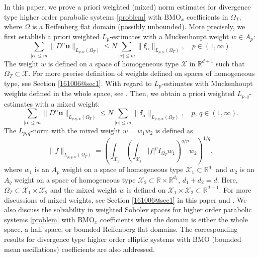 \documentclass[reqno]{amsart}
\numberwithin{equation}{section}
\theoremstyle{plain}
\theoremstyle{definition}
\theoremstyle{remark}
\begin{document}
In this paper,  we prove a priori weighted (mixed) norm estimates for divergence type higher order parabolic systems \eqref{problem} with ${\mathrm{BMO}}_x$ coefficients in  $\Omega_T$, where $\Omega$ is a Reifenberg flat domain (possibly unbounded).
More precisely, we first establish a priori weighted $L_p$-estimates with a Muckenhoupt weight $w\in A_p$:
$$
\sum_{|\alpha|\le m}\|D^\alpha {\boldsymbol{u}}\|_{L_{p,w}(\Omega_T)}\le N\sum_{|\alpha|\le m}\|{\boldsymbol{f}}_\alpha\|_{L_{p,w}(\Omega_T)}, \quad p\in (1,\infty).
$$
The weight $w$ is  defined on a space of homogeneous type ${\mathcal{X}}$ in ${\mathbb{R}}^{d+1}$ such that $\Omega_T \subset {\mathcal{X}}$. 
For  more precise definition of weights defined on spaces of homogeneous type, see Section \ref{161006@sec1}.
With regard to $L_p$-estimates with Muckenhoupt weights defined in the whole space, see \cite{MR3225808, MR3467697, arXiv:1410.6394v2, MR2286441, MR1980981}.
Then, we obtain a priori weighted $L_{p,q}$-estimates with a mixed weight:
\begin{equation}		\label{161002@eq1}
\sum_{|\alpha|\le m}\|D^\alpha {\boldsymbol{u}}\|_{L_{p,q,w}(\Omega_T)}\le N\sum_{|\alpha|\le m}\|{\boldsymbol{f}}_\alpha\|_{L_{p,q,w}(\Omega_T)}, \quad p,\,q\in (1,\infty).
\end{equation}
The $L_{p,q}$-norm with the mixed weight $w=w_1w_2$ is defined as 
\begin{equation}		\label{161007@eq1}
\|f\|_{L_{p,q,w}(\Omega_T)}=\left(\int_{{\mathcal{X}}_2}\left(\int_{{\mathcal{X}}_1}|f|^pI_{\Omega_T}w_1 \right)^{q/p}w_2 \right)^{1/q},
\end{equation}
where  $w_1$ is an $A_p$ weight  on a space of homogeneous type ${\mathcal{X}}_1\subset {\mathbb{R}}^{d_1}$ and $w_2$ is an $A_q$ weight on a space of homogeneous type ${\mathcal{X}}_2\subset {\mathbb{R}}\times {\mathbb{R}}^{d_2}$, $d_1+d_2=d$. 
Here, $\Omega_T\subset {\mathcal{X}}_1\times {\mathcal{X}}_2$ and  the mixed weight $w$ is defined on ${\mathcal{X}}_1\times {\mathcal{X}}_2 \subset {\mathbb{R}}^{d+1}$.
For more discussions of mixed weights, see Section \ref{161006@sec1} in this paper and \cite{arXiv:1603.07844v1}.
We also discuss the solvability in weighted Sobolev spaces for higher order parabolic systems \eqref{problem} with ${\mathrm{BMO}}_x$ coefficients when the domain is either the whole space, a half space, or  bounded Reifenberg flat domains.
The corresponding results for divergence type higher order elliptic systems with ${\mathrm{BMO}}$ (bounded mean oscillations) coefficients are also addressed.
\end{document}
